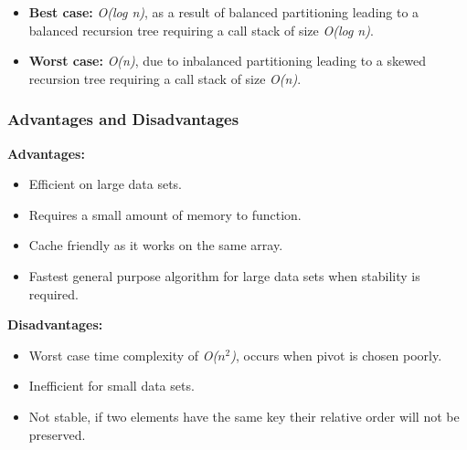 \begin{itemize}
  \item \textbf{Best case:} \textit{O(log n)}, as a result of balanced partitioning leading to a balanced recursion tree requiring a call stack of size \textit{O(log n)}.
  \item \textbf{Worst case:} \textit{O(n)}, due to inbalanced partitioning leading to a skewed recursion tree requiring a call stack of size \textit{O(n)}.
\end{itemize}

\subsubsection*{Advantages and Disadvantages}

\textbf{Advantages:}

\begin{itemize}
  \item Efficient on large data sets.
  \item Requires a small amount of memory to function.
  \item Cache friendly as it works on the same array.
  \item Fastest general purpose algorithm for large data sets when stability is required.
\end{itemize}

\textbf{Disadvantages:}

\begin{itemize}
  \item Worst case time complexity of \textit{O($n^2$)}, occurs when pivot is chosen poorly.
  \item Inefficient for small data sets.
  \item Not stable, if two elements have the same key their relative order will not be preserved.
\end{itemize}
